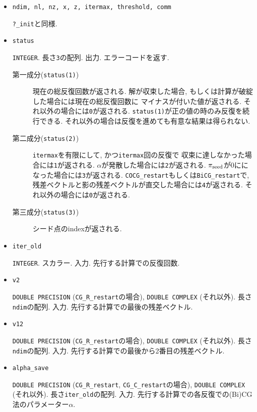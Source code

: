 \documentclass[12pt,titlepage]{jarticle}
\begin{document}
\begin{itemize}

\item \verb|ndim, nl, nz, x, z, itermax, threshold, comm|

  \verb|?_init|と同様.

\item \verb|status|

  \verb|INTEGER|. 長さ\verb|3|の配列. 出力. エラーコードを返す.
  \begin{description}
  \item [第一成分(\texttt{status(1)})]
    現在の総反復回数が返される.
    解が収束した場合, もしくは計算が破綻した場合には現在の総反復回数に
    マイナスが付いた値が返される.
    それ以外の場合には\verb|0|が返される.
    \verb|status(1)|が正の値の時のみ反復を続行できる.
    それ以外の場合は反復を進めても有意な結果は得られない.
    
  \item [第二成分(\texttt{status(2)})]
    \verb|itermax|を有限にして, かつ\verb|itermax|回の反復で
    収束に達しなかった場合には\verb|1|が返される.
    $\alpha$が発散した場合には\verb|2|が返される.
    $\pi_{\rm seed}$が0にになった場合には\verb|3|が返される.
    \verb|COCG_restart|もしくは\verb|BiCG_restart|で,
    残差ベクトルと影の残差ベクトルが直交した場合には\verb|4|が返される.
    それ以外の場合には\verb|0|が返される.

  \item [第三成分(\texttt{status(3)})]
    シード点のindexが返される.
  \end{description}

\item \verb|iter_old|

  \verb|INTEGER|. スカラー. 入力. 先行する計算での反復回数.

\item \verb|v2|

  \verb|DOUBLE PRECISION| (\verb|CG_R_restart|の場合),
  \verb|DOUBLE COMPLEX| (それ以外).
  長さ\verb|ndim|の配列. 入力.
  先行する計算での最後の残差ベクトル.

\item \verb|v12|

  \verb|DOUBLE PRECISION| (\verb|CG_R_restart|の場合),
  \verb|DOUBLE COMPLEX| (それ以外).
  長さ\verb|ndim|の配列. 入力.
  先行する計算での最後から2番目の残差ベクトル.

\item \verb|alpha_save|

  \verb|DOUBLE PRECISION| (\verb|CG_R_restart|, \verb|CG_C_restart|の場合),
  \verb|DOUBLE COMPLEX| (それ以外).
  長さ\verb|iter_old|の配列. 入力. 先行する計算での各反復での(Bi)CG法のパラメーター$\alpha$.


\end{itemize}
\end{document}
